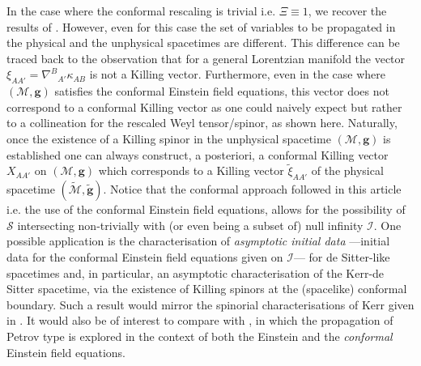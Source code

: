\documentclass[10pt,a4paper]{article}
\theoremstyle{plain}
\def\bmg{{\bm g}}
\begin{document}
In the case where the conformal rescaling is
trivial i.e. $\Xi \equiv 1$, we recover the results of
\cite{GarVal08c}. However, even for this case the set of variables to
be propagated in the physical and the unphysical spacetimes
are different. This difference can be traced back to the observation
that for a general Lorentzian manifold the vector
$\xi_{AA'}=\nabla^{B}{}_{A'}\kappa_{AB}$ is not a Killing vector.
Furthermore, even in the case where $(\mathcal{M},\bmg)$ satisfies the
conformal Einstein field equations, this vector does not correspond to
a conformal Killing vector as one could naively expect but rather to a
collineation for the rescaled Weyl tensor/spinor, as shown here. Naturally, once the existence of a
Killing spinor in the unphysical spacetime $(\mathcal{M},\bmg)$ is
established one can always construct, a posteriori, a conformal
Killing vector $X_{AA'}$ on $(\mathcal{M},\bmg)$ which corresponds to a Killing vector
$\tilde{\xi}_{AA'}$ of the physical spacetime
$(\tilde{\mathcal{M}},\tilde{\bmg})$.
Notice that the conformal approach followed in this article i.e.
the use of the conformal Einstein field equations, allows for the
possibility of $\mathcal{S}$ intersecting non-trivially with (or even
being a subset of) null infinity $\mathscr{I}$.  One possible
application is the characterisation of \emph{asymptotic initial data}
---initial data for the conformal Einstein field equations given on
$\mathscr{I}$--- for de Sitter-like spacetimes and, in particular, an
asymptotic characterisation of the Kerr-de Sitter spacetime, via the
existence of Killing spinors at the (spacelike) conformal
boundary. Such a result would mirror the spinorial characterisations
of Kerr given in \cite{BaeVal10a,BaeVal10b,BaeVal10c,BaeVal11b}. It
would also be of interest to compare with \cite{Gar16, Gar20}, in which
the propagation of Petrov type is explored in the context of both the
Einstein and the \emph{conformal} Einstein field equations.
\medskip
\end{document}

